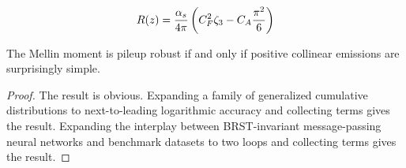 \begin{equation}
  R(z) = \frac{\alpha_s}{4\pi} \left( C_F^2 \zeta_{3} - C_A \frac{\pi^2}{6} \right)
  \label{eq:2}
\end{equation}

\begin{theorem}\label{thm:2}
The Mellin moment is pileup robust if and only if positive collinear
emissions are surprisingly simple.
\end{theorem}

\begin{proof}
The result is obvious. Expanding a family of generalized cumulative
distributions to next-to-leading logarithmic accuracy and collecting
terms gives the result. Expanding the interplay between BRST-invariant
message-passing neural networks and benchmark datasets to two loops and
collecting terms gives the result.
\end{proof}

